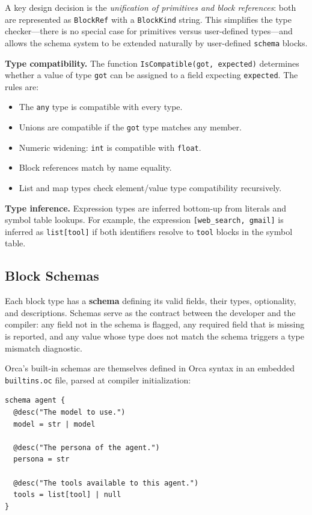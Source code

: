 \documentclass[sigconf,nonacm]{acmart}
\begin{document}
A key design decision is the \emph{unification of primitives and block
references}: both are represented as \texttt{BlockRef} with a
\texttt{BlockKind} string. This simplifies the type checker---there is
no special case for primitives versus user-defined types---and allows
the schema system to be extended naturally by user-defined \texttt{schema}
blocks.

\noindent\textbf{Type compatibility.} The function
\texttt{IsCompatible(got, expected)} determines whether a value of type
\texttt{got} can be assigned to a field expecting \texttt{expected}. The
rules are:
\begin{itemize}[leftmargin=*]
  \item The \texttt{any} type is compatible with every type.
  \item Unions are compatible if the \texttt{got} type matches any member.
  \item Numeric widening: \texttt{int} is compatible with \texttt{float}.
  \item Block references match by name equality.
  \item List and map types check element/value type compatibility recursively.
\end{itemize}

\noindent\textbf{Type inference.} Expression types are inferred
bottom-up from literals and symbol table lookups. For example, the
expression \texttt{[web\_search, gmail]} is inferred as
\texttt{list[tool]} if both identifiers resolve to \texttt{tool} blocks
in the symbol table.

\subsection{Block Schemas}
\label{sec:language:schemas}

Each block type has a \textbf{schema} defining its valid fields, their
types, optionality, and descriptions. Schemas serve as the contract between
the developer and the compiler: any field not in the schema is flagged,
any required field that is missing is reported, and any value whose type
does not match the schema triggers a type mismatch diagnostic.

Orca's built-in schemas are themselves defined in Orca syntax in an
embedded \texttt{builtins.oc} file, parsed at compiler initialization:

\begin{lstlisting}
schema agent {
  @desc("The model to use.")
  model = str | model

  @desc("The persona of the agent.")
  persona = str

  @desc("The tools available to this agent.")
  tools = list[tool] | null
}
\end{lstlisting}
\end{document}
